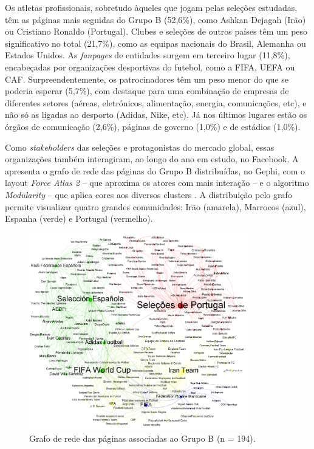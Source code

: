 \documentclass{textolivre}
\begin{document}
Os atletas profissionais, sobretudo àqueles que jogam pelas seleções estudadas, têm as páginas mais seguidas do Grupo B (52,6\%), como Ashkan Dejagah (Irão) ou Cristiano Ronaldo (Portugal). Clubes e seleções de outros países têm um peso significativo no total (21,7\%), como as equipas nacionais do Brasil, Alemanha ou Estados Unidos. As \emph{fanpages} de entidades surgem em terceiro lugar (11,8\%), encabeçadas por organizações desportivas do futebol, como a FIFA, UEFA ou CAF. Surpreendentemente, os patrocinadores têm um peso menor do que se poderia esperar (5,7\%), com destaque para uma combinação de empresas de diferentes setores (aéreas, eletrónicos, alimentação, energia, comunicações, etc), e não só as ligadas ao desporto (Adidas, Nike, etc). Já nos últimos lugares estão os órgãos de comunicação (2,6\%), páginas de governo (1,0\%) e de estádios (1,0\%).

Como \emph{stakeholders} das seleções e protagonistas do mercado global, essas organizações também interagiram, ao longo do ano em estudo, no Facebook. A  apresenta o grafo de rede das páginas do Grupo B distribuídas, no Gephi, com o layout \emph{Force Atlas 2} – que aproxima os atores com mais interação – e o algoritmo \emph{Modularity} – que aplica cores aos diversos clusters \cite{barabasi2016}. A distribuição pelo grafo permite visualizar quatro grandes comunidades: Irão (amarela), Marrocos (azul), Espanha (verde) e Portugal (vermelho).

\begin{figure}[htbp]
 \centering
 \includegraphics[width=0.85\textwidth]{figure03.png}
 \caption{Grafo de rede das páginas associadas ao Grupo B (n = 194).}
 \label{fig3}
\end{figure}
 
\end{document}
